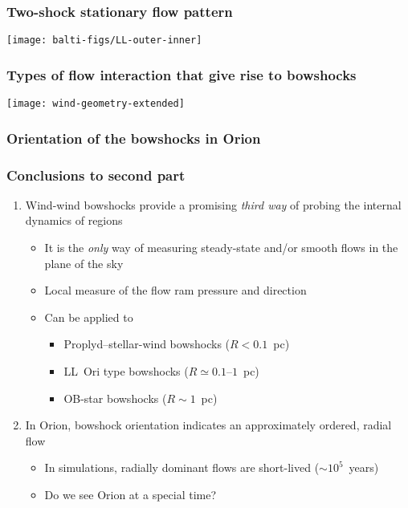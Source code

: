 \documentclass[presentation]{beamer}
\begin{document}
\begin{frame}
  \frametitle{Two-shock stationary flow pattern}
  \centering\texttt{[image: balti-figs/LL-outer-inner]}
\end{frame}

\begin{frame}
  \frametitle{Types of flow interaction that give rise to bowshocks}
  \centering\texttt{[image: wind-geometry-extended]}
\end{frame}

\begin{frame}
  \frametitle{Orientation of the bowshocks in Orion}
  \centering
\end{frame}

\begin{frame}
  \frametitle{Conclusions to second part}
  \begin{enumerate}
  \item Wind-wind bowshocks provide a promising \emph{third way} of
    probing the internal dynamics of \hii{} regions
    \begin{itemize}
    \item It is the \emph{only} way of measuring steady-state and/or
      smooth flows in the plane of the sky
    \item Local measure of the flow ram pressure and direction
    \item Can be applied to
      \begin{itemize}
      \item Proplyd--stellar-wind bowshocks (\(R < 0.1\)~pc)
      \item LL~Ori type bowshocks (\(R \simeq 0.1\)--\(1\)~pc)
      \item OB-star bowshocks (\(R \sim 1\)~pc)
      \end{itemize}

    \end{itemize}
  \item In Orion, bowshock orientation indicates an approximately
    ordered, radial flow
    \begin{itemize}
    \item In simulations, radially dominant flows are
      short-lived (\(\sim 10^5\)~years)
    \item Do we see Orion at a special time?
    \end{itemize}

  \end{enumerate}
\end{frame}
\end{document}
